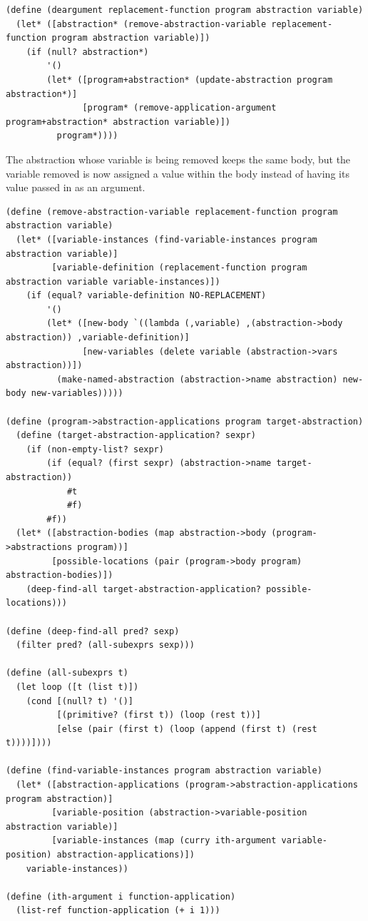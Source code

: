 \documentclass[a4paper,10pt]{article}
\begin{document}
\begin{lstlisting}[frame=trbl]
(define (deargument replacement-function program abstraction variable)
  (let* ([abstraction* (remove-abstraction-variable replacement-function program abstraction variable)])
    (if (null? abstraction*)
        '()
        (let* ([program+abstraction* (update-abstraction program abstraction*)]
               [program* (remove-application-argument program+abstraction* abstraction variable)])
          program*))))
\end{lstlisting}
The abstraction whose variable is being removed keeps the same body, but the variable removed is now assigned a value within the body instead of having its value passed in as an argument.
\begin{lstlisting}[frame=trbl]
(define (remove-abstraction-variable replacement-function program abstraction variable)
  (let* ([variable-instances (find-variable-instances program abstraction variable)]
         [variable-definition (replacement-function program abstraction variable variable-instances)])
    (if (equal? variable-definition NO-REPLACEMENT)
        '()
        (let* ([new-body `((lambda (,variable) ,(abstraction->body abstraction)) ,variable-definition)]
               [new-variables (delete variable (abstraction->vars abstraction))])
          (make-named-abstraction (abstraction->name abstraction) new-body new-variables)))))

(define (program->abstraction-applications program target-abstraction)
  (define (target-abstraction-application? sexpr)
    (if (non-empty-list? sexpr)
        (if (equal? (first sexpr) (abstraction->name target-abstraction))
            #t
            #f)
        #f))
  (let* ([abstraction-bodies (map abstraction->body (program->abstractions program))]
         [possible-locations (pair (program->body program) abstraction-bodies)])
    (deep-find-all target-abstraction-application? possible-locations)))

(define (deep-find-all pred? sexp)
  (filter pred? (all-subexprs sexp)))

(define (all-subexprs t)
  (let loop ([t (list t)])
    (cond [(null? t) '()]
          [(primitive? (first t)) (loop (rest t))]
          [else (pair (first t) (loop (append (first t) (rest t))))])))

(define (find-variable-instances program abstraction variable)
  (let* ([abstraction-applications (program->abstraction-applications program abstraction)]
         [variable-position (abstraction->variable-position abstraction variable)]
         [variable-instances (map (curry ith-argument variable-position) abstraction-applications)])
    variable-instances))

(define (ith-argument i function-application)
  (list-ref function-application (+ i 1)))
\end{lstlisting}
\end{document}
